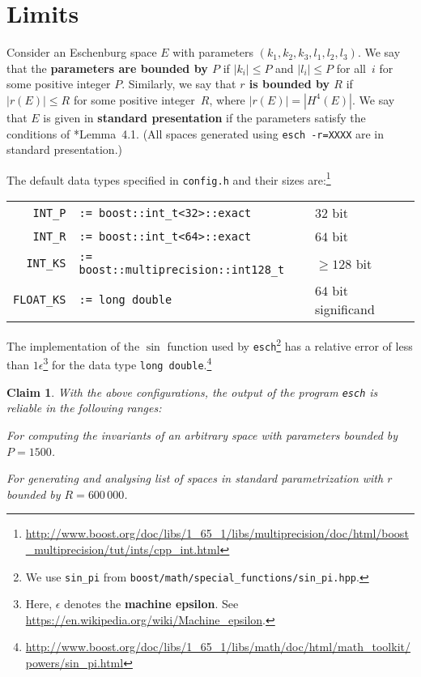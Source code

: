 \documentclass{article}
\newtheorem{claim}{Claim}
\newcommand{\abs}[1]{\left|#1\right|}
\newcommand{\macheps}{\epsilon} %
\begin{document}
\section*{Limits}
Consider an Eschenburg space \(E\) with parameters \((k_1,k_2,k_3,l_1,l_2,l_3)\).   We say that the \textbf{parameters are bounded by \(P\)} if \(\abs{k_i}\leq P\) and \(\abs{l_i}\leq P\) for all~\(i\) for some positive integer \(P\).  Similarly, we say that \textbf{\(r\) is bounded by \(R\)} if \(\abs{r(E)}\leq R\) for some positive integer~\(R\), where  \(\abs{r(E)} = |H^4(E)|\).  We say that \(E\) is given in \textbf{standard presentation} if the parameters satisfy the conditions of \cite{CEZ}*{Lemma~4.1}.  (All spaces generated using \verb+esch -r=XXXX+ are in standard presentation.)

The default data types specified in \verb+config.h+ and their sizes are:\footnote{
  \mbox{\url{http://www.boost.org/doc/libs/1_65_1/libs/multiprecision/doc/html/boost_multiprecision/tut/ints/cpp_int.html}}%
}

  \begin{tabular}{rp{22em}l}
    \verb+INT_P+ & \verb+:= boost::int_t<32>::exact+ & \(32\) bit \\
    \verb+INT_R+ & \verb+:= boost::int_t<64>::exact+ & \(64\) bit \\
    \verb+INT_KS+ & \verb+:= boost::multiprecision::int128_t+ & \(\geq 128\) bit \\
    \verb+FLOAT_KS+ & \verb+:= long double+ & \(64\) bit significand
  \end{tabular}

The implementation of the \(\sin\) function used by \verb+esch+\footnote{
  We use \verb+sin_pi+ from \verb+boost/math/special_functions/sin_pi.hpp+.%
}
has a relative error of less than \(1\macheps\)\footnote{
  Here, \(\macheps\) denotes the \textbf{machine epsilon}.
  See \url{https://en.wikipedia.org/wiki/Machine_epsilon}.%
}
for the data type \texttt{long double}.\footnote{
  \mbox{\url{http://www.boost.org/doc/libs/1_65_1/libs/math/doc/html/math_toolkit/powers/sin_pi.html}}%
}

\begin{claim}\label{claim:default}
  With the above configurations, the output of the program \verb+esch+ is reliable in the following ranges:
  \begin{compactitem}
  \item For computing the invariants of an arbitrary space with parameters bounded by \(P=1500\).
  \item For generating and analysing list of spaces in standard parametrization with \(r\) bounded by \(R=600\,000\).
  \end{compactitem}
\end{claim}
\end{document}
